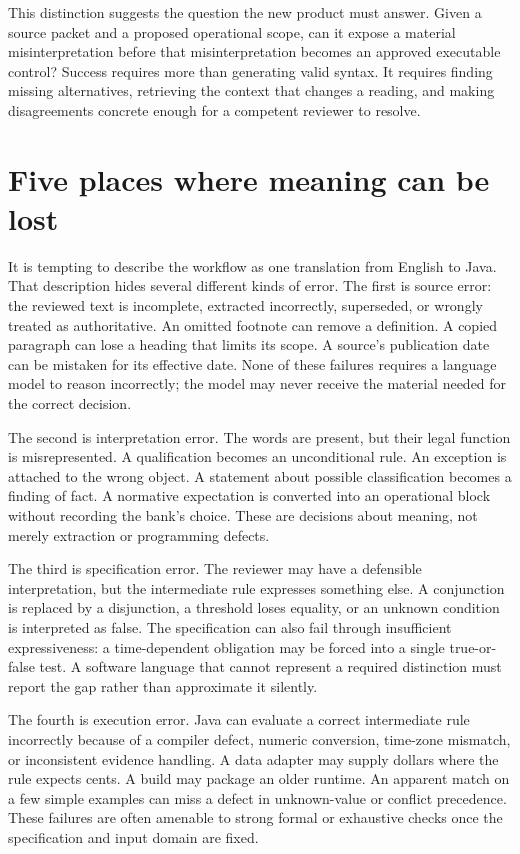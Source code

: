 \documentclass[12pt,a4paper,oneside,openany]{book}
\begin{document}
This distinction suggests the question the new product must answer. Given a
source packet and a proposed operational scope, can it expose a material
misinterpretation before that misinterpretation becomes an approved executable
control? Success requires more than generating valid syntax. It requires finding
missing alternatives, retrieving the context that changes a reading, and making
disagreements concrete enough for a competent reviewer to resolve.

\section{Five places where meaning can be lost}
\label{merge:M01:02}

\label{sec:problem-boundaries}
It is tempting to describe the workflow as one translation from English to
Java. That description hides several different kinds of error. The first is
source error: the reviewed text is incomplete, extracted incorrectly, superseded,
or wrongly treated as authoritative. An omitted footnote can remove a definition.
A copied paragraph can lose a heading that limits its scope. A source's
publication date can be mistaken for its effective date. None of these failures
requires a language model to reason incorrectly; the model may never receive
the material needed for the correct decision.

The second is interpretation error. The words are present, but their legal
function is misrepresented. A qualification becomes an unconditional rule. An
exception is attached to the wrong object. A statement about possible
classification becomes a finding of fact. A normative expectation is converted
into an operational block without recording the bank's choice. These are
decisions about meaning, not merely extraction or programming defects.

The third is specification error. The reviewer may have a defensible
interpretation, but the intermediate rule expresses something else. A conjunction
is replaced by a disjunction, a threshold loses equality, or an unknown condition
is interpreted as false. The specification can also fail through insufficient
expressiveness: a time-dependent obligation may be forced into a single true-or-false
test. A software language that cannot represent a required distinction must
report the gap rather than approximate it silently.

The fourth is execution error. Java can evaluate a correct intermediate rule
incorrectly because of a compiler defect, numeric conversion, time-zone mismatch,
or inconsistent evidence handling. A data adapter may supply dollars where the
rule expects cents. A build may package an older runtime. An apparent match on a
few simple examples can miss a defect in unknown-value or conflict precedence.
These failures are often amenable to strong formal or exhaustive checks once
the specification and input domain are fixed.
\end{document}
